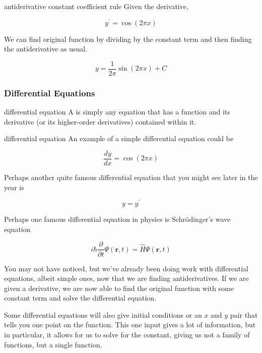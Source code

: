 \begin{example}{antiderivative constant coefficient rule}
    Given the derivative,
    
    \[ y^\prime = \cos{\left( 2\pi x \right)} \]
    
    We can find original function by dividing by the constant term and then finding the antiderivative as usual.
    
    \[ y = \dfrac{1}{2 \pi} \sin{\left( 2 \pi x \right)} + C \]
\end{example}

\subsubsection{Differential Equations}

\begin{definition}{differential equation}
    A  is simply any equation that has a function and its derivative (or its higher-order derivatives) contained within it.
\end{definition}

\begin{example}{differential equation}
    An example of a simple differential equation could be
    
    \[ \dfrac{dy}{dx} = \cos{\left( 2\pi x \right)} \]
    
    Perhaps another quite famous differential equation that you might see later in the year is
    
    \[ y = y^\prime \]
    
    Perhaps one famous differential equation in physics is Schrödinger's wave equation
    
    \[ i \hbar \dfrac{\partial}{\partial t}\Psi \left( \mathbf{r} , t \right) = \hat H \Psi \left( \mathbf{r}, t \right) \]
\end{example}

You may not have noticed, but we've already been doing work with differential equations, albeit simple ones, now that we are finding antiderivatives. If we are given a derivative, we are now able to find the original function with some constant term and solve the differential equation.

Some differential equations will also give initial conditions or an \( x \) and \( y \) pair that tells you one point on the function. This one input gives a lot of information, but in particular, it allows for us to solve for the constant, giving us not a family of functions, but a single function.

